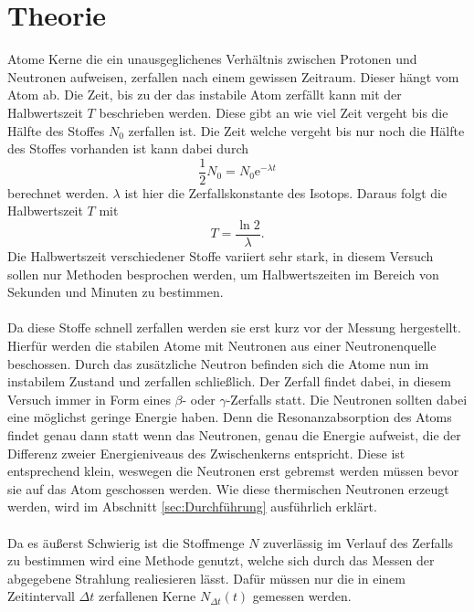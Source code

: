 \section{Theorie}
\label{sec:Theorie}

Atome Kerne die ein unausgeglichenes Verhältnis zwischen Protonen und Neutronen aufweisen, zerfallen nach einem gewissen Zeitraum.
Dieser hängt vom Atom ab.
Die Zeit, bis zu der das instabile Atom zerfällt kann mit der Halbwertszeit $T$ beschrieben werden.
Diese gibt an wie viel Zeit vergeht bis die Hälfte des Stoffes $N_0$ zerfallen ist.
Die Zeit welche vergeht bis nur noch die Hälfte des Stoffes vorhanden ist kann dabei durch 
\begin{equation*}
    \frac{1}{2}N_0 = N_0 \text{e}^{-\lambda t}
\end{equation*}
berechnet werden.
$\lambda$ ist hier die Zerfallskonstante des Isotops.
Daraus folgt die Halbwertszeit $T$ mit 
\begin{equation}
    T = \frac{\ln{2}}{\lambda}.
    \label{eqn:Halbwertszeit}
\end{equation}
Die Halbwertszeit verschiedener Stoffe variiert sehr stark, in diesem Versuch sollen nur Methoden besprochen werden, 
um Halbwertszeiten im Bereich von Sekunden und Minuten zu bestimmen.
\\\\
Da diese Stoffe schnell zerfallen werden sie erst kurz vor der Messung hergestellt.
Hierfür werden die stabilen Atome mit Neutronen aus einer Neutronenquelle beschossen.
Durch das zusätzliche Neutron befinden sich die Atome nun im instabilem Zustand und zerfallen schließlich.
Der Zerfall findet dabei, in diesem Versuch immer in Form eines $\beta$- oder $\gamma$-Zerfalls statt.
Die Neutronen sollten dabei eine möglichst geringe Energie haben.
Denn die Resonanzabsorption des Atoms findet genau dann statt wenn das Neutronen, genau die Energie aufweist, die der Differenz zweier Energieniveaus des Zwischenkerns entspricht.
Diese ist entsprechend klein, weswegen die Neutronen erst gebremst werden müssen bevor sie auf das Atom geschossen werden.
Wie diese thermischen Neutronen erzeugt werden, wird im Abschnitt \ref{sec:Durchführung} ausführlich erklärt.
\\\\
Da es äußerst Schwierig ist die Stoffmenge $N$ zuverlässig im Verlauf des Zerfalls zu bestimmen wird eine Methode genutzt, welche sich durch das Messen der abgegebene Strahlung realiesieren lässt.
Dafür müssen nur die in einem Zeitintervall $\Delta t$ zerfallenen Kerne $N_{\Delta t}(t)$ gemessen werden.
